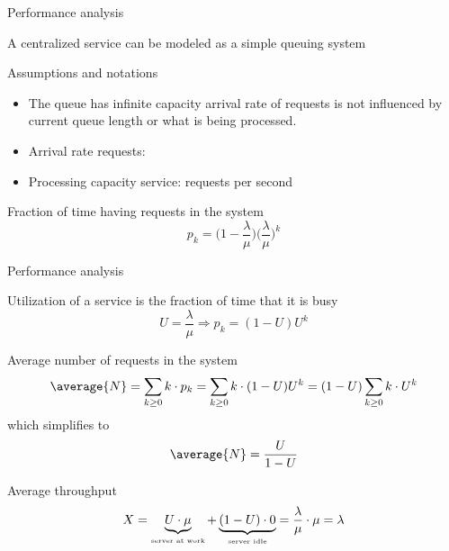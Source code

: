   \begin{slide}{Performance analysis}
    \begin{block}{A centralized service can be modeled as a simple queuing system}
      \centering{}
    \end{block}
    \begin{block}{Assumptions and notations}
      \begin{itemize}\tightlist
      \item The queue has infinite capacity \mathexpr{\Rightarrow} arrival rate of requests is not influenced
        by current queue length or what is being processed.
      \item Arrival rate requests: \mathexpr{\lambda}
      \item Processing capacity service: \mathexpr{\mu} requests per second
      \end{itemize}
    \end{block}
    \begin{alertblock}{Fraction of time having  requests in the system}
      \[ p_k = \bigl(1 - \frac{\lambda}{\mu}\bigr)\bigl(\frac{\lambda}{\mu}\bigr)^k \]
    \end{alertblock}
  \end{slide}
  \begin{slide}{Performance analysis}
    \begin{block}{Utilization  of a service is the fraction of time that it is busy}
      \[ U = \frac{\lambda}{\mu} \Rightarrow p_k = (1-U) U^k \]
    \end{block}
    \begin{block}{Average number of requests in the system}
      \[ \average{N} = \sum_{k\geq 0} k \cdot p_k = \sum_{k \geq 0} k \cdot (1-U)U^k = (1-U)\sum_{k\geq 0} k\cdot U^k \]
      which simplifies to \[ \average{N} = \frac{U}{1-U} \]
    \end{block}
    \begin{block}{Average throughput}
      \[ X = \underbrace{U \cdot \mu}_{\mbox{\tiny server at work}} + \underbrace{(1-U) \cdot 0}_{\mbox{\tiny
        server idle}} = \frac{\lambda}{\mu} \cdot \mu = \lambda \]
    \end{block}
  \end{slide}

